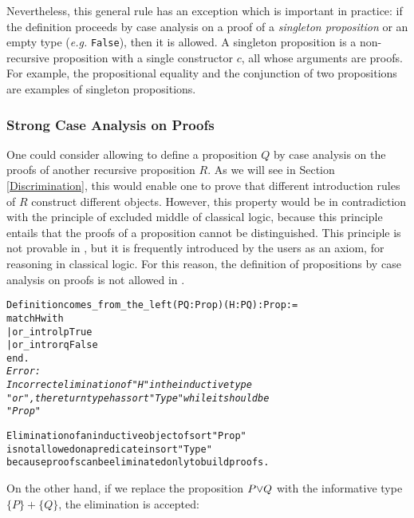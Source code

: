 \documentclass[11pt]{article}
\begin{document}
Nevertheless, this general rule has an exception which is important in
practice: if the definition proceeds by case analysis on a proof of a
\textsl{singleton proposition} or an empty type (\emph{e.g.} \texttt{False}),
 then it is allowed. A singleton
proposition is a non-recursive proposition with a single constructor
$c$, all whose arguments are proofs. For example, the propositional
equality and the conjunction of two propositions are examples of
singleton propositions.


\subsubsection{Strong Case Analysis on Proofs}

One could consider allowing
 to define a proposition $Q$ by case
analysis on the proofs of another recursive proposition $R$. As we
will see in Section \ref{Discrimination}, this would enable one to prove that
different introduction rules of $R$ construct different
objects. However, this property would be in contradiction with the principle
of excluded middle of classical logic, because this principle entails
that the proofs of a proposition cannot be distinguished. This
principle is not provable in {\coq}, but it is frequently introduced by
the users as an axiom, for reasoning in classical logic. For this
reason, the definition of propositions by case analysis on proofs is
 not allowed in {\coq}.

\begin{alltt}

Definition comes_from_the_left (P Q:Prop)(H:P{\coqor}Q): Prop :=
 match H with
         |  or_introl p {\funarrow} True
         |  or_intror q {\funarrow} False
 end.
\it
Error:
Incorrect elimination of "H" in the inductive type
"or", the return type has sort "Type" while it should be
"Prop"

Elimination of an inductive object of sort "Prop"
is not allowed on a predicate in sort "Type"
because proofs can be eliminated only to build proofs.

\end{alltt}

On the other hand, if we replace the proposition $P {\mbox{\(\vee\)}} Q$ with
the informative type $\{P\}+\{Q\}$, the elimination  is accepted:
\end{document}
